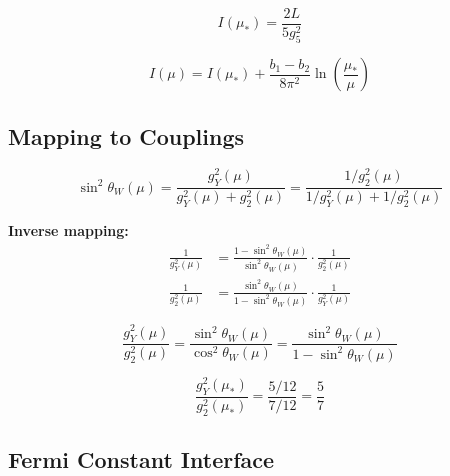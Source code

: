 \documentclass[11pt,a4paper]{article}
\theoremstyle{definition}
\begin{document}
\begin{equation}
\label{eq:I_at_mu_star}
I(\mu_*) = \frac{2L}{5g_5^2}
\end{equation}

\begin{equation}
\label{eq:I_at_mu}
I(\mu) = I(\mu_*) + \frac{b_1 - b_2}{8\pi^2}\ln\left(\frac{\mu_*}{\mu}\right)
\end{equation}

\subsection{Mapping to Couplings}
\label{subsec:coupling_mapping}

\begin{apibox}
\begin{equation}
\label{eq:api_sw2_to_couplings}
\boxed{\sin^2\theta_W(\mu) = \frac{g_Y^2(\mu)}{g_Y^2(\mu) + g_2^2(\mu)} = \frac{1/g_2^2(\mu)}{1/g_Y^2(\mu) + 1/g_2^2(\mu)}}
\end{equation}

\textbf{Inverse mapping:}
\begin{align}
\label{eq:gY_from_sw2}
\frac{1}{g_Y^2(\mu)} &= \frac{1 - \sin^2\theta_W(\mu)}{\sin^2\theta_W(\mu)}\cdot\frac{1}{g_2^2(\mu)} \\
\label{eq:g2_from_sw2}
\frac{1}{g_2^2(\mu)} &= \frac{\sin^2\theta_W(\mu)}{1 - \sin^2\theta_W(\mu)}\cdot\frac{1}{g_Y^2(\mu)}
\end{align}
\end{apibox}

\begin{equation}
\label{eq:sw2_to_ratio}
\frac{g_Y^2(\mu)}{g_2^2(\mu)} = \frac{\sin^2\theta_W(\mu)}{\cos^2\theta_W(\mu)} = \frac{\sin^2\theta_W(\mu)}{1 - \sin^2\theta_W(\mu)}
\end{equation}

\begin{equation}
\label{eq:ratio_at_mu_star}
\frac{g_Y^2(\mu_*)}{g_2^2(\mu_*)} = \frac{5/12}{7/12} = \frac{5}{7}
\end{equation}

\subsection{Fermi Constant Interface}
\label{subsec:GF_interface}
\end{document}
